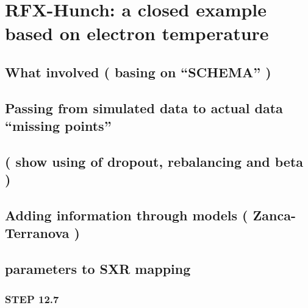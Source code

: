 \chapter{RFX-Hunch: a closed example based on electron temperature}
\label{section:RFXhunch}

\section{What involved ( basing on “SCHEMA” )} %
\section{Passing from simulated data to actual data  “missing points”  }


\section{( show using of dropout, rebalancing and beta )}


\section{Adding information through models ( Zanca-Terranova )}


\section{parameters to SXR mapping}

\subsection{STEP 12.7}

